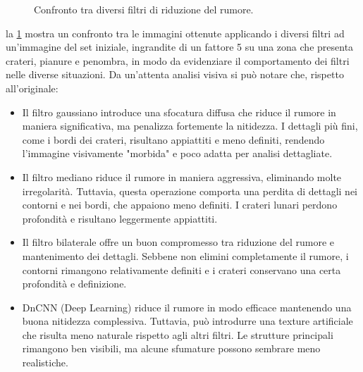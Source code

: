 \begin{figure}[H]
    \caption{Confronto tra diversi filtri di riduzione del rumore.}
    \label{fig:confronto-filtri}
\end{figure}

la \cref{fig:confronto-filtri} mostra un confronto tra le immagini ottenute applicando i diversi filtri ad un'immagine del set iniziale, ingrandite di un fattore 5 su una zona che presenta crateri, pianure e penombra, in modo da evidenziare il comportamento dei filtri nelle diverse situazioni. Da un'attenta analisi visiva si può notare che, rispetto all'originale:

\begin{itemize}
    \item Il filtro gaussiano introduce una sfocatura diffusa che riduce il rumore in maniera significativa, ma penalizza fortemente la nitidezza. I dettagli più fini, come i bordi dei crateri, risultano appiattiti e meno definiti, rendendo l'immagine visivamente "morbida" e poco adatta per analisi dettagliate.

    \item Il filtro mediano riduce il rumore in maniera aggressiva, eliminando molte irregolarità. Tuttavia, questa operazione comporta una perdita di dettagli nei contorni e nei bordi, che appaiono meno definiti. I crateri lunari perdono profondità e risultano leggermente appiattiti.

    \item Il filtro bilaterale offre un buon compromesso tra riduzione del rumore e mantenimento dei dettagli. Sebbene non elimini completamente il rumore, i contorni rimangono relativamente definiti e i crateri conservano una certa profondità e definizione.

    \item DnCNN (Deep Learning) riduce il rumore in modo efficace mantenendo una buona nitidezza complessiva. Tuttavia, può introdurre una texture artificiale che risulta meno naturale rispetto agli altri filtri. Le strutture principali rimangono ben visibili, ma alcune sfumature possono sembrare meno realistiche.
\end{itemize}

